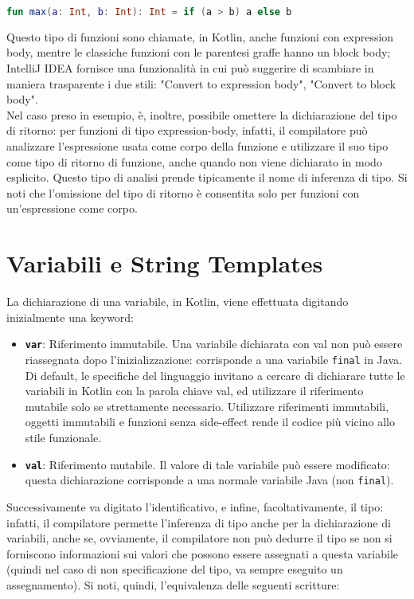 \begin{lstlisting}[caption={Inline-function}, captionpos=b, label={lst:exampleInlineFunction}, language=Kotlin]
fun max(a: Int, b: Int): Int = if (a > b) a else b
\end{lstlisting}

Questo tipo di funzioni sono chiamate, in Kotlin, anche funzioni con expression body, mentre le classiche funzioni con le parentesi graffe hanno un block body; IntelliJ IDEA fornisce una funzionalità in cui può suggerire di scambiare in maniera trasparente i due stili: "Convert to expression body", "Convert to block body".\\

Nel caso preso in esempio, è, inoltre, possibile omettere la dichiarazione del tipo di ritorno:
per funzioni di tipo expression-body, infatti, il compilatore può analizzare l'espressione usata come corpo della funzione e utilizzare il suo tipo come tipo di ritorno di funzione, anche quando non viene dichiarato in modo esplicito. Questo tipo di analisi prende tipicamente il nome di inferenza di tipo. Si noti che l'omissione del tipo di ritorno è consentita solo per funzioni con un'espressione come corpo.\\

\section{Variabili e String Templates}
La dichiarazione di una variabile, in Kotlin, viene effettuata digitando inizialmente una keyword:
\begin{itemize}
  \item {\bfseries\texttt{var}}: Riferimento immutabile. Una variabile dichiarata con val non può essere
  riassegnata dopo l'inizializzazione: corrisponde a una variabile \texttt{final} in Java. Di default, le specifiche del linguaggio invitano a cercare di dichiarare tutte le variabili in Kotlin con la parola chiave val, ed utilizzare il riferimento mutabile solo se strettamente necessario. Utilizzare riferimenti immutabili, oggetti immutabili e funzioni senza side-effect rende il codice più vicino allo stile funzionale.
  \item {\bfseries\texttt{val}}: Riferimento mutabile. Il valore di tale variabile può essere modificato: questa dichiarazione corrisponde a una normale variabile Java (non \texttt{final}).
\end{itemize}

Successivamente va digitato l'identificativo, e infine, facoltativamente, il tipo: infatti, il compilatore permette l'inferenza di tipo anche per la dichiarazione di variabili, anche se, ovviamente, il compilatore non può dedurre il tipo se non si forniscono informazioni sui valori che possono
essere assegnati a questa variabile (quindi nel caso di non specificazione del tipo, va sempre eseguito un assegnamento). Si noti, quindi, l'equivalenza delle seguenti scritture:

